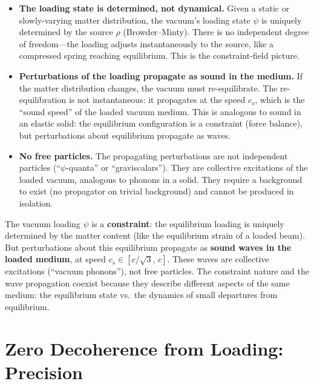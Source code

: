 \documentclass[11pt,a4paper]{article}
\begin{document}
\begin{itemize}
\item \textbf{The loading state is determined, not dynamical.}  Given a
static or slowly-varying matter distribution, the vacuum's loading state
$\psi$ is uniquely determined by the source $\rho$ (Browder--Minty).
There is no independent degree of freedom---the loading adjusts
instantaneously to the source, like a compressed spring reaching
equilibrium.  This is the constraint-field picture.

\item \textbf{Perturbations of the loading propagate as sound in the
medium.}  If the matter distribution changes, the vacuum must
re-equilibrate.  The re-equilibration is not instantaneous: it
propagates at the speed $c_s$, which is the ``sound speed'' of the
loaded vacuum medium.  This is analogous to sound in an elastic solid:
the equilibrium configuration is a constraint (force balance), but
perturbations about equilibrium propagate as waves.

\item \textbf{No free particles.}  The propagating perturbations are not
independent particles (``$\psi$-quanta'' or ``graviscalars'').  They are
collective excitations of the loaded vacuum, analogous to phonons in a
solid.  They require a background to exist (no propagator on trivial
background) and cannot be produced in isolation.
\end{itemize}

\begin{tcolorbox}[colback=green!5, colframe=green!50!black,
title=Loading Interpretation of Constraint vs.\ Propagation]
The vacuum loading $\psi$ is a \textbf{constraint}: the equilibrium
loading is uniquely determined by the matter content (like the
equilibrium strain of a loaded beam).  But perturbations about this
equilibrium propagate as \textbf{sound waves in the loaded medium}, at
speed $c_s \in [c/\sqrt{3},\, c]$.  These waves are collective
excitations (``vacuum phonons''), not free particles.  The constraint
nature and the wave propagation coexist because they describe different
aspects of the same medium: the equilibrium state vs.\ the dynamics of
small departures from equilibrium.
\end{tcolorbox}


\section{Zero Decoherence from Loading: Precision}
\label{sec:zero-decoherence}
\end{document}
